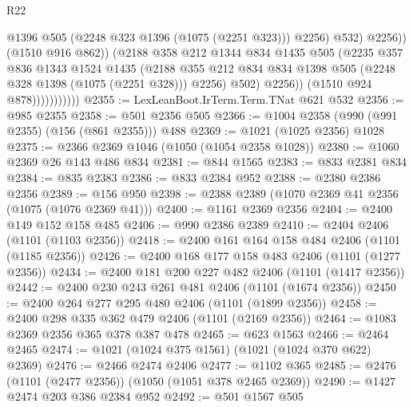 \begin{lexlean}{R22}
\begin{coremodule}
                                    @1396
                                    @505
                                    (@2248 @323 @1396 (@1075 (@2251 @323)))
                                    @2256)
                                  @532)
                                @2256))
                            (@1510 @916 @862))
                          (@2188
                            @358
                            @212
                            @1344
                            @834
                            @1435
                            @505
                            (@2235
                              @357
                              @836
                              @1343
                              @1524
                              @1435
                              (@2188
                                @355
                                @212
                                @834
                                @834
                                @1398
                                @505
                                (@2248 @328 @1398 (@1075 (@2251 @328)))
                                @2256)
                              @502)
                            @2256))
                        (@1510 @924 @878)))))))))))
@2355 := LexLeanBoot.IrTerm.Term.TNat @621 @532
@2356 := @985 @2355
@2358 := @501 @2356 @505
@2366 := @1004 @2358 (@990 (@991 @2355) (@156 (@861 @2355))) @488
@2369 := @1021 (@1025 @2356) @1028
@2375 := @2366 @2369 @1046 (@1050 (@1054 @2358 @1028))
@2380 := @1060 @2369 @26 @143 @486 @834
@2381 := @844 @1565
@2383 := @833 @2381 @834
@2384 := @835 @2383
@2386 := @833 @2384 @952
@2388 := @2380 @2386 @2356
@2389 := @156 @950
@2398 := @2388 @2389 (@1070 @2369 @41 @2356 (@1075 (@1076 @2369 @41)))
@2400 := @1161 @2369 @2356
@2404 := @2400 @149 @152 @158 @485
@2406 := @990 @2386 @2389
@2410 := @2404 @2406 (@1101 (@1103 @2356))
@2418 := @2400 @161 @164 @158 @484 @2406 (@1101 (@1185 @2356))
@2426 := @2400 @168 @177 @158 @483 @2406 (@1101 (@1277 @2356))
@2434 := @2400 @181 @200 @227 @482 @2406 (@1101 (@1417 @2356))
@2442 := @2400 @230 @243 @261 @481 @2406 (@1101 (@1674 @2356))
@2450 := @2400 @264 @277 @295 @480 @2406 (@1101 (@1899 @2356))
@2458 := @2400 @298 @335 @362 @479 @2406 (@1101 (@2169 @2356))
@2464 := @1083 @2369 @2356 @365 @378 @387 @478
@2465 := @623 @1563
@2466 := @2464 @2465
@2474 := @1021 (@1024 @375 @1561) (@1021 (@1024 @370 @622) @2369)
@2476 := @2466 @2474 @2406
@2477 := @1102 @365
@2485 := @2476 (@1101 (@2477 @2356)) (@1050 (@1051 @378 @2465 @2369))
@2490 := @1427 @2474 @203 @386 @2384 @952
@2492 := @501 @1567 @505

\end{coremodule}
\end{lexlean}
